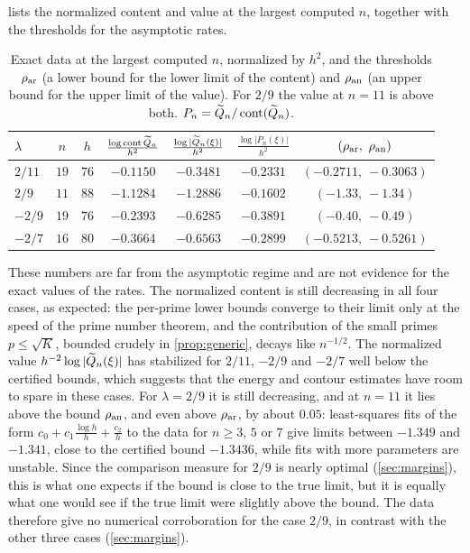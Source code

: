  lists the normalized content and value at the largest computed $n$, together with the thresholds for the asymptotic rates.

\begin{table}[ht]
\centering
\caption{Exact data at the largest computed $n$, normalized by $h^2$, and the thresholds $\rho_{\mathrm{ar}}$ (a lower bound for the lower limit of the content) and $\rho_{\mathrm{an}}$ (an upper bound for the upper limit of the value). For $2/9$ the value at $n=11$ is above both. $P_n=\widetilde{Q}_n/\operatorname{cont}(\widetilde{Q}_n)$.}
\label{tab:numerics}
\begin{tabular}{@{}lcccccc@{}}
\toprule
$\lambda$ & $n$ & $h$ & $\frac{\log\operatorname{cont}\widetilde{Q}_n}{h^2}$ & $\frac{\log|\widetilde{Q}_n(\xi)|}{h^2}$ & $\frac{\log|P_n(\xi)|}{h^2}$ & $(\rar,\ \ran)$\\
\midrule
$2/11$ & $19$ & $76$ & $-0.1150$ & $-0.3481$ & $-0.2331$ & $(-0.2711,\ -0.3063)$\\
$2/9$ & $11$ & $88$ & $-1.1284$ & $-1.2886$ & $-0.1602$ & $(-1.33,\ -1.34)$\\
$-2/9$ & $19$ & $76$ & $-0.2393$ & $-0.6285$ & $-0.3891$ & $(-0.40,\ -0.49)$\\
$-2/7$ & $16$ & $80$ & $-0.3664$ & $-0.6563$ & $-0.2899$ & $(-0.5213,\ -0.5261)$\\
\bottomrule
\end{tabular}
\end{table}

These numbers are far from the asymptotic regime and are not evidence for the exact values of the rates. The normalized content is still decreasing in all four cases, as expected: the per-prime lower bounds converge to their limit only at the speed of the prime number theorem, and the contribution of the small primes $p\le\sqrt K$, bounded crudely in \cref{prop:generic}, decays like $n^{-1/2}$. The normalized value $h^{-2}\log|\widetilde{Q}_n(\xi)|$ has stabilized for $2/11$, $-2/9$ and $-2/7$ well below the certified bounds, which suggests that the energy and contour estimates have room to spare in these cases. For $\lambda=2/9$ it is still decreasing, and at $n=11$ it lies above the bound $\rho_{\mathrm{an}}$, and even above $\rho_{\mathrm{ar}}$, by about $0.05$: least-squares fits of the form $c_0+c_1\frac{\log h}h+\frac{c_2}h$ to the data for $n\ge3$, $5$ or $7$ give limits between $-1.349$ and $-1.341$, close to the certified bound $-1.3436$, while fits with more parameters are unstable. Since the comparison measure for $2/9$ is nearly optimal (\cref{sec:margins}), this is what one expects if the bound is close to the true limit, but it is equally what one would see if the true limit were slightly above the bound. The data therefore give no numerical corroboration for the case $2/9$, in contrast with the other three cases (\cref{sec:margins}).
